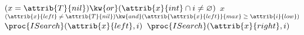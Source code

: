 \begin{codebox}
\li \If $(x = \attrib{T}{nil}) \kw{ or } (\attrib{x}{int} \cap i \neq \varnothing)$
\li \Then 
        \Return $x$
\li \Else \If $(\attrib{x}{left} \neq \attrib{T}{nil}) \kw{ and } (\attrib{\attrib{x}{left}}{max} \geq \attrib{i}{low})$
\li     \Return $\proc{ISearch}(\attrib{x}{left},i)$
\li \Else 
\li     \Return $\proc{ISearch}(\attrib{x}{right},i)$
    \End
\end{codebox}